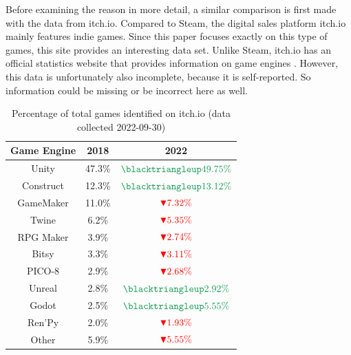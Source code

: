 Before examining the reason in more detail, a similar comparison is first made with the data from itch.io.
Compared to Steam, the digital sales platform itch.io mainly features indie games.
Since this paper focuses exactly on this type of games, this site provides an interesting data set.
Unlike Steam, itch.io has an official statistics website that provides information on game engines \cite{itchio-engines}.
However, this data is unfortunately also incomplete, because it is self-reported.
So information could be missing or be incorrect here as well.

\begin{table}[h!]
    \centering
    \begin{tabular}{|c c c|}
        \hline
        Game Engine & 2018   & 2022                                                \\
        \hline\hline
        Unity       & 47.3\% & $\textcolor{ForestGreen}{\blacktriangleup 49.75\%}$ \\
        Construct   & 12.3\% & $\textcolor{ForestGreen}{\blacktriangleup 13.12\%}$ \\
        GameMaker   & 11.0\% & $\textcolor{red}{\blacktriangledown 7.32\%}$        \\
        Twine       & 6.2\%  & $\textcolor{red}{\blacktriangledown 5.35\%}$        \\
        RPG Maker   & 3.9\%  & $\textcolor{red}{\blacktriangledown 2.74\%}$        \\
        Bitsy       & 3.3\%  & $\textcolor{red}{\blacktriangledown 3.11\%}$        \\
        PICO-8      & 2.9\%  & $\textcolor{red}{\blacktriangledown 2.68\%}$        \\
        Unreal      & 2.8\%  & $\textcolor{ForestGreen}{\blacktriangleup 2.92\%}$  \\
        Godot       & 2.5\%  & $\textcolor{ForestGreen}{\blacktriangleup 5.55\%}$  \\
        Ren'Py      & 2.0\%  & $\textcolor{red}{\blacktriangledown 1.93\%}$        \\
        Other       & 5.9\%  & $\textcolor{red}{\blacktriangledown 5.55\%}$        \\
        \hline
    \end{tabular}
    \caption{Percentage of total games identified on itch.io (data collected 2022-09-30)}
    \label{table:itch}
\end{table}


